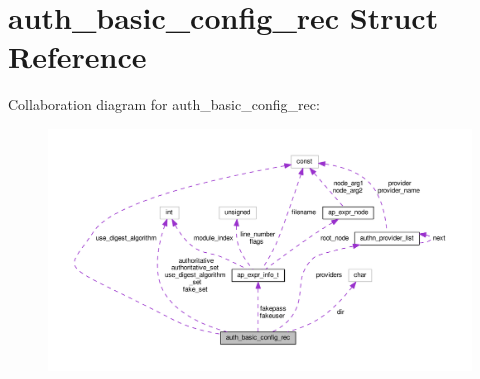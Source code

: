 \hypertarget{structauth__basic__config__rec}{}\section{auth\+\_\+basic\+\_\+config\+\_\+rec Struct Reference}
\label{structauth__basic__config__rec}


Collaboration diagram for auth\+\_\+basic\+\_\+config\+\_\+rec\+:
\nopagebreak
\begin{figure}[H]
\begin{center}
\leavevmode
\includegraphics[width=350pt]{structauth__basic__config__rec__coll__graph}
\end{center}
\end{figure}
